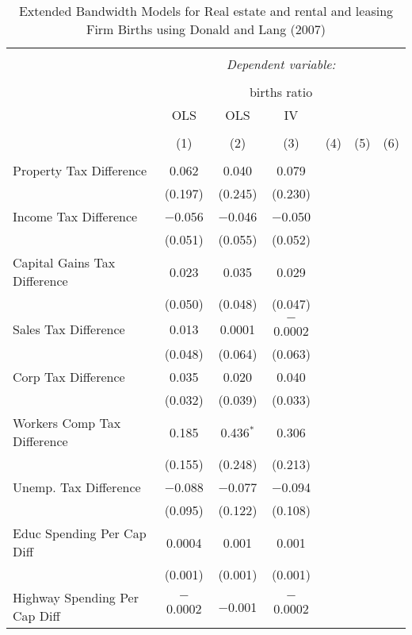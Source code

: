 
\begin{table}[!htbp] \centering 
  \caption{Extended Bandwidth Models for  Real estate and rental and leasing Firm Births using Donald and Lang (2007)} 
  \label{} 
\begin{tabular}{@{\extracolsep{5pt}}lcccccc} 
\\[-1.8ex]\hline 
\hline \\[-1.8ex] 
 & \multicolumn{6}{c}{\textit{Dependent variable:}} \\ 
\cline{2-7} 
\\[-1.8ex] & \multicolumn{6}{c}{births ratio} \\ 
 & OLS & OLS & IV &  &  &  \\ 
\\[-1.8ex] & (1) & (2) & (3) & (4) & (5) & (6)\\ 
\hline \\[-1.8ex] 
 Property Tax Difference & 0.062 & 0.040 & 0.079 &  &  &  \\ 
  & (0.197) & (0.245) & (0.230) &  &  &  \\ 
  Income Tax Difference & $-$0.056 & $-$0.046 & $-$0.050 &  &  &  \\ 
  & (0.051) & (0.055) & (0.052) &  &  &  \\ 
  Capital Gains Tax Difference & 0.023 & 0.035 & 0.029 &  &  &  \\ 
  & (0.050) & (0.048) & (0.047) &  &  &  \\ 
  Sales Tax Difference & 0.013 & 0.0001 & $-$0.0002 &  &  &  \\ 
  & (0.048) & (0.064) & (0.063) &  &  &  \\ 
  Corp Tax Difference & 0.035 & 0.020 & 0.040 &  &  &  \\ 
  & (0.032) & (0.039) & (0.033) &  &  &  \\ 
  Workers Comp Tax Difference & 0.185 & 0.436$^{*}$ & 0.306 &  &  &  \\ 
  & (0.155) & (0.248) & (0.213) &  &  &  \\ 
  Unemp. Tax Difference & $-$0.088 & $-$0.077 & $-$0.094 &  &  &  \\ 
  & (0.095) & (0.122) & (0.108) &  &  &  \\ 
  Educ Spending Per Cap Diff & 0.0004 & 0.001 & 0.001 &  &  &  \\ 
  & (0.001) & (0.001) & (0.001) &  &  &  \\ 
  Highway Spending Per Cap Diff & $-$0.0002 & $-$0.001 & $-$0.0002 &  &  &  \\ 

\end{tabular}
\end{table}
